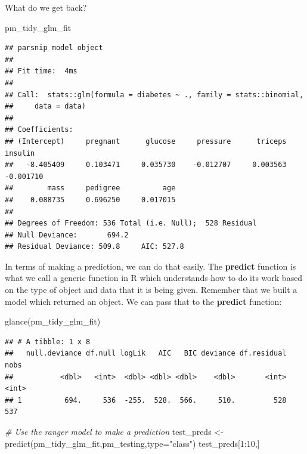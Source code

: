 \documentclass[
]{article}
\newenvironment{Shaded}{\begin{snugshade}}{\end{snugshade}}
\newcommand{\AttributeTok}[1]{\textcolor[rgb]{0.77,0.63,0.00}{#1}}
\newcommand{\CommentTok}[1]{\textcolor[rgb]{0.56,0.35,0.01}{\textit{#1}}}
\newcommand{\DecValTok}[1]{\textcolor[rgb]{0.00,0.00,0.81}{#1}}
\newcommand{\FunctionTok}[1]{\textcolor[rgb]{0.00,0.00,0.00}{#1}}
\newcommand{\NormalTok}[1]{#1}
\newcommand{\OtherTok}[1]{\textcolor[rgb]{0.56,0.35,0.01}{#1}}
\newcommand{\SpecialCharTok}[1]{\textcolor[rgb]{0.00,0.00,0.00}{#1}}
\newcommand{\StringTok}[1]{\textcolor[rgb]{0.31,0.60,0.02}{#1}}
\begin{document}
What do we get back?

\begin{Shaded}
\begin{Highlighting}[]
\NormalTok{pm\_tidy\_glm\_fit}
\end{Highlighting}
\end{Shaded}

\begin{verbatim}
## parsnip model object
## 
## Fit time:  4ms 
## 
## Call:  stats::glm(formula = diabetes ~ ., family = stats::binomial, 
##     data = data)
## 
## Coefficients:
## (Intercept)     pregnant      glucose     pressure      triceps      insulin  
##   -8.405409     0.103471     0.035730    -0.012707     0.003563    -0.001710  
##        mass     pedigree          age  
##    0.088735     0.696250     0.017015  
## 
## Degrees of Freedom: 536 Total (i.e. Null);  528 Residual
## Null Deviance:       694.2 
## Residual Deviance: 509.8     AIC: 527.8
\end{verbatim}

In terms of making a prediction, we can do that easily. The
\textbf{predict} function is what we call a generic function in R which
understands how to do its work based on the type of object and data that
it is being given. Remember that we built a model which returned an
object. We can pass that to the \textbf{predict} function:

\begin{Shaded}
\begin{Highlighting}[]
\FunctionTok{glance}\NormalTok{(pm\_tidy\_glm\_fit)}
\end{Highlighting}
\end{Shaded}

\begin{verbatim}
## # A tibble: 1 x 8
##   null.deviance df.null logLik   AIC   BIC deviance df.residual  nobs
##           <dbl>   <int>  <dbl> <dbl> <dbl>    <dbl>       <int> <int>
## 1          694.     536  -255.  528.  566.     510.         528   537
\end{verbatim}

\begin{Shaded}
\begin{Highlighting}[]
\CommentTok{\# Use the ranger model to make a prediction}
\NormalTok{test\_preds }\OtherTok{\textless{}{-}} \FunctionTok{predict}\NormalTok{(pm\_tidy\_glm\_fit,pm\_testing,}\AttributeTok{type=}\StringTok{"class"}\NormalTok{)}
\NormalTok{test\_preds[}\DecValTok{1}\SpecialCharTok{:}\DecValTok{10}\NormalTok{,]}
\end{Highlighting}
\end{Shaded}
\end{document}
